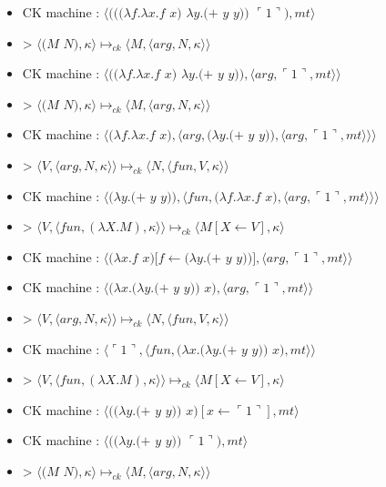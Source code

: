 \documentclass[10pt,a4paper]{article}
\begin{document}
				\begin{itemize}
					\item[] CK machine : $\langle(((\lambda f.\lambda x.f$ $x)$ $\lambda y.(+$ $y$ $y))$ $\ulcorner 1\urcorner),mt\rangle$
					\item[] > $\langle(M$ $N),\kappa\rangle \longmapsto_{ck} \langle M,\langle arg,N,\kappa\rangle\rangle$
					\item[] CK machine : $\langle((\lambda f.\lambda x.f$ $x)$ $\lambda y.(+$ $y$ $y)),\langle arg,\ulcorner 1\urcorner,mt\rangle\rangle$
					\item[] > $\langle(M$ $N),\kappa\rangle \longmapsto_{ck} \langle M,\langle arg,N,\kappa\rangle\rangle$
					\item[] CK machine : $\langle(\lambda f.\lambda x.f$ $x),\langle arg,(\lambda y.(+$ $y$ $y)),\langle arg,\ulcorner 1\urcorner,mt\rangle\rangle\rangle$	
					\item[] > $\langle V,\langle arg,N,\kappa \rangle \rangle \longmapsto_{ck} \langle N,\langle fun,V,\kappa \rangle \rangle$
					\item[] CK machine : $\langle(\lambda y.(+$ $y$ $y)),\langle fun,(\lambda f.\lambda x.f$ $x),\langle arg,\ulcorner 1\urcorner,mt\rangle\rangle\rangle$	
					\item[] > $\langle V,\langle fun,(\lambda X.M),\kappa \rangle \rangle \longmapsto_{ck} \langle M[X \leftarrow V],\kappa\rangle$
					\item[] CK machine : $\langle(\lambda x.f$ $x)[f\leftarrow(\lambda y.(+$ $y$ $y))],\langle arg,\ulcorner 1\urcorner,mt\rangle\rangle$	
					\item[] CK machine : $\langle(\lambda x.(\lambda y.(+$ $y$ $y))$ $x),\langle arg,\ulcorner 1\urcorner,mt\rangle\rangle$	
					\item[] > $\langle V,\langle arg,N,\kappa \rangle \rangle \longmapsto_{ck} \langle N,\langle fun,V,\kappa \rangle \rangle$
					\item[] CK machine : $\langle\ulcorner 1\urcorner,\langle fun,(\lambda x.(\lambda y.(+$ $y$ $y))$ $x),mt\rangle\rangle$
					\item[] > $\langle V,\langle fun,(\lambda X.M),\kappa \rangle \rangle \longmapsto_{ck} \langle M[X \leftarrow V],\kappa\rangle$		
					\item[] CK machine : $\langle((\lambda y.(+$ $y$ $y))$ $x)[x \leftarrow \ulcorner 1\urcorner ],mt\rangle$
					\item[] CK machine : $\langle((\lambda y.(+$ $y$ $y))$ $\ulcorner 1\urcorner),mt\rangle$
					\item[] > $\langle(M$ $N),\kappa\rangle \longmapsto_{ck} \langle M,\langle arg,N,\kappa\rangle\rangle$

\end{itemize}
\end{document}
